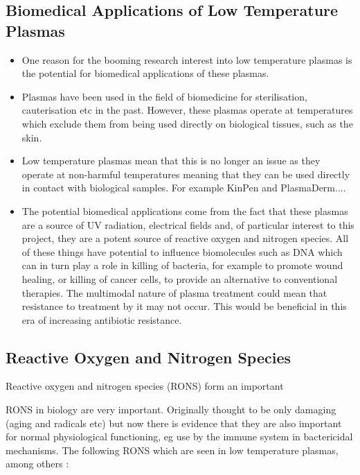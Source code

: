 \documentclass[11pt, oneside]{article}   	%
\begin{document}
\subsection{Biomedical Applications of Low Temperature Plasmas}

\begin{itemize}

\item One reason for the booming research interest into low temperature plasmas is the potential for biomedical applications of these plasmas.
\item Plasmas have been used in the field of biomedicine for sterilisation, cauterisation etc in the past. However, these plasmas operate at temperatures which exclude them from being used directly on biological tissues, such as the skin.
\item Low temperature plasmas mean that this is no longer an issue as they operate at non-harmful temperatures meaning that they can be used directly in contact with biological samples. 
For example KinPen and PlasmaDerm....

\item The potential biomedical applications come from the fact that these plasmas are a source of UV radiation, electrical fields and, of particular interest to this project, they are a potent source of reactive oxygen and nitrogen species. All of these things have potential to influence biomolecules such as DNA which can in turn play a role in killing of bacteria, for example to promote wound healing, or killing of cancer cells, to provide an alternative to conventional therapies. 
The multimodal nature of plasma treatment could mean that resistance to treatment by it may not occur. 
This would be beneficial in this era of increasing antibiotic resistance.

\end{itemize}


\subsection{Reactive Oxygen and Nitrogen Species}
Reactive oxygen and nitrogen species (RONS) form an important 


RONS in biology are very important. Originally thought to be only damaging (aging and radicals etc) but now there is evidence that they are also important for normal physiological functioning, eg use by the immune system in bactericidal mechanisms.
The following RONS which are seen in low temperature plasmas, among others \cite{Graves2014}:
\end{document}
